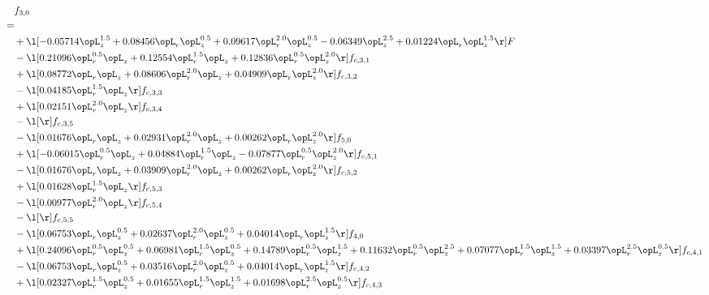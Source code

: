 \begin{alignat}{2} 
\label{eq:f_30_2} 
& f_{3,0} \nonumber \\ 
 = \\ 
& + \l[  -0.05714 \opL_z^{1.5} +  0.08456 \opL_r \opL_z^{0.5} +  0.09617 \opL_r^{2.0} \opL_z^{0.5}   -0.06349 \opL_z^{2.5} +  0.01224 \opL_r \opL_z^{1.5}  \r] F \nonumber \\ 
& - \l[  0.21096 \opL_r^{0.5} \opL_z +  0.12554 \opL_r^{1.5} \opL_z +  0.12836 \opL_r^{0.5} \opL_z^{2.0}  \r] f_{c,3,1} \nonumber \\ 
& + \l[  0.08772 \opL_r \opL_z +  0.08606 \opL_r^{2.0} \opL_z +  0.04909 \opL_r \opL_z^{2.0}  \r] f_{c,3,2} \nonumber \\ 
& - \l[  0.04185 \opL_r^{1.5} \opL_z  \r] f_{c,3,3} \nonumber \\ 
& + \l[  0.02151 \opL_r^{2.0} \opL_z  \r] f_{c,3,4} \nonumber \\ 
& - \l[  \r] f_{c,3,5} \nonumber \\ 
& - \l[  0.01676 \opL_r \opL_z +  0.02931 \opL_r^{2.0} \opL_z +  0.00262 \opL_r \opL_z^{2.0}  \r] f_{5,0} \nonumber \\ 
& + \l[  -0.06015 \opL_r^{0.5} \opL_z +  0.04884 \opL_r^{1.5} \opL_z   -0.07877 \opL_r^{0.5} \opL_z^{2.0}  \r] f_{c,5,1} \nonumber \\ 
& - \l[  0.01676 \opL_r \opL_z +  0.03909 \opL_r^{2.0} \opL_z +  0.00262 \opL_r \opL_z^{2.0}  \r] f_{c,5,2} \nonumber \\ 
& + \l[  0.01628 \opL_r^{1.5} \opL_z  \r] f_{c,5,3} \nonumber \\ 
& - \l[  0.00977 \opL_r^{2.0} \opL_z  \r] f_{c,5,4} \nonumber \\ 
& - \l[  \r] f_{c,5,5} \nonumber \\ 
& - \l[  0.06753 \opL_r \opL_z^{0.5} +  0.02637 \opL_r^{2.0} \opL_z^{0.5} +  0.04014 \opL_r \opL_z^{1.5}  \r] f_{4,0} \nonumber \\ 
& + \l[  0.24096 \opL_r^{0.5} \opL_z^{0.5} +  0.06981 \opL_r^{1.5} \opL_z^{0.5} +  0.14789 \opL_r^{0.5} \opL_z^{1.5} +  0.11632 \opL_r^{0.5} \opL_z^{2.5} +  0.07077 \opL_r^{1.5} \opL_z^{1.5} +  0.03397 \opL_r^{2.5} \opL_z^{0.5}  \r] f_{c,4,1} \nonumber \\ 
& - \l[  0.06753 \opL_r \opL_z^{0.5} +  0.03516 \opL_r^{2.0} \opL_z^{0.5} +  0.04014 \opL_r \opL_z^{1.5}  \r] f_{c,4,2} \nonumber \\ 
& + \l[  0.02327 \opL_r^{1.5} \opL_z^{0.5} +  0.01655 \opL_r^{1.5} \opL_z^{1.5} +  0.01698 \opL_r^{2.5} \opL_z^{0.5}  \r] f_{c,4,3} \nonumber \\ 

\end{alignat}
